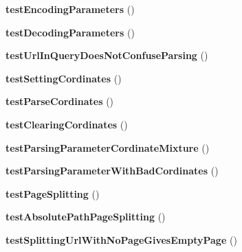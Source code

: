 \begin{DoxyCompactItemize}
\item 
\hypertarget{class_test_of_url_a4613b3de7377e09dfbbfc3f7f0aa4349}{
{\bfseries testEncodingParameters} ()}
\label{class_test_of_url_a4613b3de7377e09dfbbfc3f7f0aa4349}

\item 
\hypertarget{class_test_of_url_a46bba71463bb358d603a1cb476012ca7}{
{\bfseries testDecodingParameters} ()}
\label{class_test_of_url_a46bba71463bb358d603a1cb476012ca7}

\item 
\hypertarget{class_test_of_url_a453417cabefa482d22d2e90fe4ab29dc}{
{\bfseries testUrlInQueryDoesNotConfuseParsing} ()}
\label{class_test_of_url_a453417cabefa482d22d2e90fe4ab29dc}

\item 
\hypertarget{class_test_of_url_ad0850762726feab3677f3af2f84b106a}{
{\bfseries testSettingCordinates} ()}
\label{class_test_of_url_ad0850762726feab3677f3af2f84b106a}

\item 
\hypertarget{class_test_of_url_ad866702bfdffd7549dbeed83f8eb9383}{
{\bfseries testParseCordinates} ()}
\label{class_test_of_url_ad866702bfdffd7549dbeed83f8eb9383}

\item 
\hypertarget{class_test_of_url_a109189bb209ae98e3193efcc7d0fc05c}{
{\bfseries testClearingCordinates} ()}
\label{class_test_of_url_a109189bb209ae98e3193efcc7d0fc05c}

\item 
\hypertarget{class_test_of_url_a3cd25d60a86f74c8680d94ee42288d1c}{
{\bfseries testParsingParameterCordinateMixture} ()}
\label{class_test_of_url_a3cd25d60a86f74c8680d94ee42288d1c}

\item 
\hypertarget{class_test_of_url_a6c6d8d4bbc0d3e49bd06e0298fc51413}{
{\bfseries testParsingParameterWithBadCordinates} ()}
\label{class_test_of_url_a6c6d8d4bbc0d3e49bd06e0298fc51413}

\item 
\hypertarget{class_test_of_url_a649d22649d0b2cf351c7c0174beb79fe}{
{\bfseries testPageSplitting} ()}
\label{class_test_of_url_a649d22649d0b2cf351c7c0174beb79fe}

\item 
\hypertarget{class_test_of_url_abc543ccd61000f4f0601fa17d3a2e555}{
{\bfseries testAbsolutePathPageSplitting} ()}
\label{class_test_of_url_abc543ccd61000f4f0601fa17d3a2e555}

\item 
\hypertarget{class_test_of_url_af5da710016a094409f829b16ad2eb695}{
{\bfseries testSplittingUrlWithNoPageGivesEmptyPage} ()}
\label{class_test_of_url_af5da710016a094409f829b16ad2eb695}


\end{DoxyCompactItemize}
